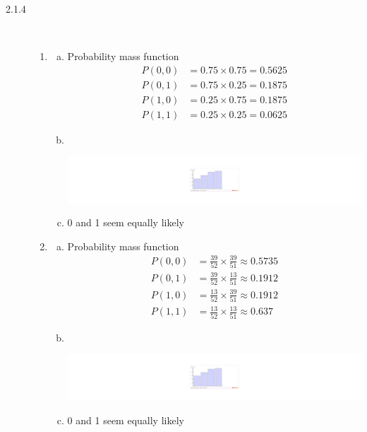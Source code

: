 \documentclass[letterpaper,10pt]{article}
\begin{document}
\begin{description}
\item[2.1.4] \ 
\begin{enumerate}
\item
\begin{enumerate}[a)]
\item Probability mass function
\begin{align*}
P(0, 0) &= 0.75 \times 0.75 = 0.5625 \\
P(0, 1) &= 0.75 \times 0.25 = 0.1875 \\
P(1, 0) &= 0.25 \times 0.75 = 0.1875 \\
P(1, 1) &= 0.25 \times 0.25 = 0.0625
\end{align*}
\item \ 
\begin{center}
\includegraphics[scale=0.75]{module2b.pdf}
\end{center}
\item 0 and 1 seem equally likely
\end{enumerate}
\item
\begin{enumerate}[a)]
\item Probability mass function
\begin{align*}
P(0, 0) &= \frac{39}{52} \times \frac{39}{51} \approx 0.5735 \\
P(0, 1) &= \frac{39}{52} \times \frac{13}{51} \approx 0.1912 \\
P(1, 0) &= \frac{13}{52} \times \frac{39}{51} \approx 0.1912 \\
P(1, 1) &= \frac{13}{52} \times \frac{13}{51} \approx 0.637
\end{align*}
\item  \ 
\begin{center}
\includegraphics[scale=0.75]{module2c.pdf}
\end{center}
\item 0 and 1 seem equally likely
\end{enumerate}
\end{enumerate}


\end{description}
\end{document}
